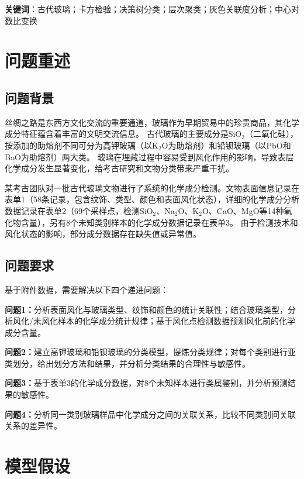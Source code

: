 \documentclass[12pt,a4paper]{ctexart}
\begin{document}
\textbf{关键词}：古代玻璃；卡方检验；决策树分类；层次聚类；灰色关联度分析；中心对数比变换
\newpage

\section{问题重述}

\subsection{问题背景}

丝绸之路是东西方文化交流的重要通道，玻璃作为早期贸易中的珍贵商品，其化学成分特征蕴含着丰富的文明交流信息。
古代玻璃的主要成分是SiO$_2$（二氧化硅），按添加的助熔剂不同可分为高钾玻璃（以K$_2$O为助熔剂）和铅钡玻璃（以PbO和BaO为助熔剂）两大类\cite{1}。
玻璃在埋藏过程中容易受到风化作用的影响，导致表层化学成分发生显著变化，给考古研究和文物分类带来严重干扰。

某考古团队对一批古代玻璃文物进行了系统的化学成分检测。文物表面信息记录在表单1（58条记录，包含纹饰、类型、颜色和表面风化状态），详细的化学成分分析数据记录在表单2（69个采样点，检测SiO$_2$、Na$_2$O、K$_2$O、CaO、MgO等14种氧化物含量），另有8个未知类别样本的化学成分数据记录在表单3。
由于检测技术和风化状态的影响，部分成分数据存在缺失值或异常值。

\subsection{问题要求}

基于附件数据，需要解决以下四个递进问题：

\textbf{问题1：}分析表面风化与玻璃类型、纹饰和颜色的统计关联性；结合玻璃类型，分析风化/未风化样本的化学成分统计规律；基于风化点检测数据预测风化前的化学成分含量。

\textbf{问题2：}建立高钾玻璃和铅钡玻璃的分类模型，提炼分类规律；对每个类别进行亚类划分，给出划分方法和结果，并分析分类结果的合理性与敏感性。

\textbf{问题3：}基于表单3的化学成分数据，对8个未知样本进行类属鉴别，并分析预测结果的敏感性。

\textbf{问题4：}分析同一类别玻璃样品中化学成分之间的关联关系，比较不同类别间关联关系的差异性。

\newpage

\section{模型假设}
\end{document}
